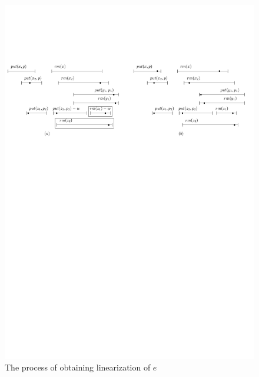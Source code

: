 

%
%
\begin{figure}[t]
  \centering
  \includegraphics[width=1 \textwidth]{figures/PIC-HIS-EPQ1-TwoHis-2.pdf}
  \caption{The process of obtaining linearization of $e$}
  \label{fig:concurrent execution for EPQ1}
\end{figure}




